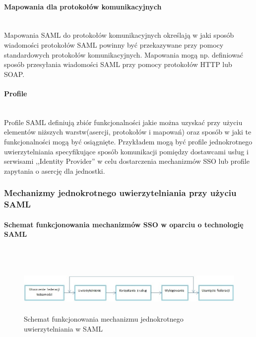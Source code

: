 		\paragraph{Mapowania dla protokołów komunikacyjnych}\mbox{}\\

			Mapowania SAML do protokołów komunikacyjnych określają w jaki sposób wiadomości protokołów SAML powinny być przekazywane przy pomocy standardowych protokołów komunikacyjnych.  Mapowania mogą np. definiować sposób przesyłania wiadomości SAML przy pomocy protokołów HTTP lub SOAP.

		\paragraph{Profile}\mbox{}\\

			Profile SAML definiują zbiór funkcjonalności jakie można uzyskać przy użyciu elementów niższych warstw(asercji, protokołów i mapowań) oraz sposób w jaki te funkcjonalności mogą być osiągnięte. Przykładem mogą być profile jednokrotnego uwierzytelniania specyfikujące sposób komunikacji pomiędzy dostawcami usług i serwisami ,,Identity Provider'' w celu dostarczenia mechanizmów SSO lub profile zapytania o asercję dla jednostki.

	\subsubsection{Mechanizmy jednokrotnego uwierzytelniania przy użyciu SAML}

		\paragraph{Schemat funkcjonowania mechanizmów SSO w oparciu o technologię SAML}\mbox{}\\

			\begin{figure}[h]
				\centering
					\includegraphics[width=15cm,height=2.5cm]{img/samlSSO.jpg}
				\caption{Schemat funkcjonowania mechanizmu jednokrotnego uwierzytelniania w SAML}
				\label{Schemat funkcjonowania mechanizmu jednokrotnego uwierzytelniania w SAML}
			\end{figure}

